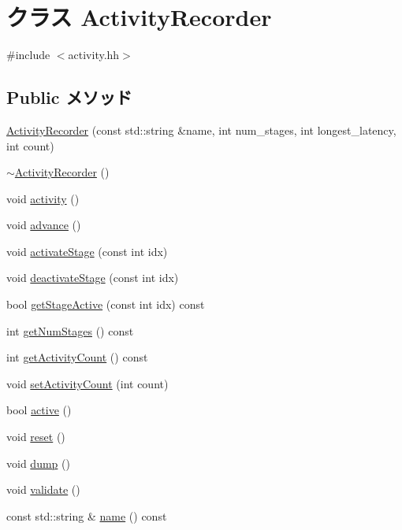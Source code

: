 \hypertarget{classActivityRecorder}{
\section{クラス ActivityRecorder}
\label{classActivityRecorder}
}


{\ttfamily \#include $<$activity.hh$>$}\subsection*{Public メソッド}
\begin{DoxyCompactItemize}
\item 
\hyperlink{classActivityRecorder_aee994d49a31bd533aa152dfeb18c7b2d}{ActivityRecorder} (const std::string \&name, int num\_\-stages, int longest\_\-latency, int count)
\item 
\hyperlink{classActivityRecorder_a72527148fb233d9e5a0d887becb03458}{$\sim$ActivityRecorder} ()
\item 
void \hyperlink{classActivityRecorder_a0ea760b87a5516ee794818d5eb8c243d}{activity} ()
\item 
void \hyperlink{classActivityRecorder_a8903a4e9f3d5fb42d0faa9d53e21d85c}{advance} ()
\item 
void \hyperlink{classActivityRecorder_a9039dad8d295c41b50eba0342e6c11c0}{activateStage} (const int idx)
\item 
void \hyperlink{classActivityRecorder_a4d73bea02eaf6f93e267391592556fe7}{deactivateStage} (const int idx)
\item 
bool \hyperlink{classActivityRecorder_a918c8f58bd15e33d7d44a37109a868e4}{getStageActive} (const int idx) const 
\item 
int \hyperlink{classActivityRecorder_aabc85525e8d2526f4a909313fcb9bfa2}{getNumStages} () const 
\item 
int \hyperlink{classActivityRecorder_a24e9ead78b85428639a9e76329ecd0b7}{getActivityCount} () const 
\item 
void \hyperlink{classActivityRecorder_a562d654f23b8a293deda98e8d585973f}{setActivityCount} (int count)
\item 
bool \hyperlink{classActivityRecorder_a0cb3050c8a4f6bdb2c1f727eec8d9701}{active} ()
\item 
void \hyperlink{classActivityRecorder_ad20897c5c8bd47f5d4005989bead0e55}{reset} ()
\item 
void \hyperlink{classActivityRecorder_accd2600060dbaee3a3b41aed4034c63c}{dump} ()
\item 
void \hyperlink{classActivityRecorder_a41d45236c37b75848f4b1667a11fb50e}{validate} ()
\item 
const std::string \& \hyperlink{classActivityRecorder_a324e8c54c4c5161913681a1a52fef959}{name} () const 
\end{DoxyCompactItemize}
